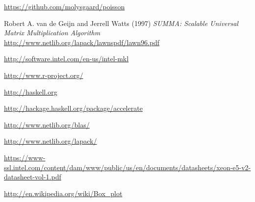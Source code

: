 \documentclass{article}
\begin{document}
\begin{thebibliography}{9}

  \url{https://github.com/molysgaard/poisson}

  Robert A. van de Geijn and Jerrell Watts (1997)
  \emph{SUMMA: Scalable Universal Matrix Multiplication Algorithm}
  \url{http://www.netlib.org/lapack/lawnspdf/lawn96.pdf}
 
  \url{http://software.intel.com/en-us/intel-mkl}

  \url{http://www.r-project.org/}

  \url{http://haskell.org}

  \url{http://hackage.haskell.org/package/accelerate}

  \url{http://www.netlib.org/blas/}

  \url{http://www.netlib.org/lapack/}

  \url{https://www-ssl.intel.com/content/dam/www/public/us/en/documents/datasheets/xeon-e5-v2-datasheet-vol-1.pdf}

  \url{http://en.wikipedia.org/wiki/Box_plot}

\end{thebibliography}
\end{document}
